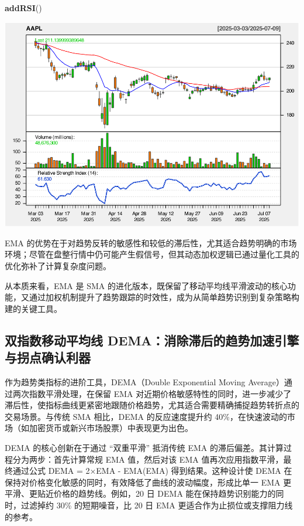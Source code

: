 \documentclass[]{ctexbook}
\newenvironment{Shaded}{\begin{snugshade}}{\end{snugshade}}
\newcommand{\FunctionTok}[1]{\textcolor[rgb]{0.13,0.29,0.53}{\textbf{#1}}}
\newcommand{\NormalTok}[1]{#1}
\begin{document}
\begin{Shaded}
\begin{Highlighting}[]
\FunctionTok{addRSI}\NormalTok{()}
\end{Highlighting}
\end{Shaded}

\includegraphics[width=0.9\linewidth]{quantmod_files/figure-latex/ema_2-4}

EMA 的优势在于对趋势反转的敏感性和较低的滞后性，尤其适合趋势明确的市场环境；尽管在盘整行情中仍可能产生假信号，但其动态加权逻辑已通过量化工具的优化弥补了计算复杂度问题。

从本质来看，EMA 是 SMA 的进化版本，既保留了移动平均线平滑波动的核心功能，又通过加权机制提升了趋势跟踪的时效性，成为从简单趋势识别到复杂策略构建的关键工具。

\subsection{双指数移动平均线 DEMA：消除滞后的趋势加速引擎与拐点确认利器}\label{ux53ccux6307ux6570ux79fbux52a8ux5e73ux5747ux7ebf-demaux6d88ux9664ux6edeux540eux7684ux8d8bux52bfux52a0ux901fux5f15ux64ceux4e0eux62d0ux70b9ux786eux8ba4ux5229ux5668}

作为趋势类指标的进阶工具，DEMA（Double Exponential Moving Average）通过两次指数平滑处理，在保留 EMA 对近期价格敏感特性的同时，进一步减少了滞后性，使指标曲线更紧密地跟随价格趋势，尤其适合需要精确捕捉趋势转折点的交易场景。与传统 SMA 相比，DEMA 的反应速度提升约 40\%，在快速波动的市场（如加密货币或新兴市场股票）中表现更为出色。

DEMA 的核心创新在于通过 ``双重平滑'' 抵消传统 EMA 的滞后偏差。其计算过程分为两步：首先计算常规 EMA 值，然后对该 EMA 值再次应用指数平滑，最终通过公式 DEMA = 2×EMA - EMA(EMA) 得到结果。这种设计使 DEMA 在保持对价格变化敏感的同时，有效降低了曲线的波动幅度，形成比单一 EMA 更平滑、更贴近价格的趋势线。例如，20 日 DEMA 能在保持趋势识别能力的同时，过滤掉约 30\% 的短期噪音，比 20 日 EMA 更适合作为止损位或支撑阻力线的参考。
\end{document}
